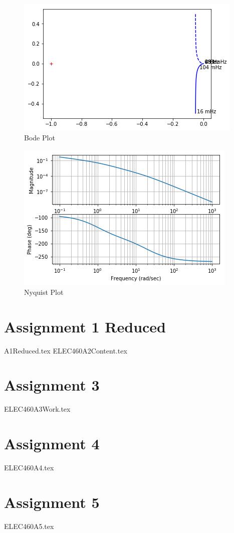 \documentclass{scrreprt}
\theoremstyle{plain}
\theoremstyle{definition}
\theoremstyle{remark}
\begin{document}
\begin{figure}
	\includegraphics[width=0.7\linewidth]{Assignments/A1/ipython_files/qt_img494204706881540}
	\caption{Bode Plot}
\end{figure}

\begin{figure}
	\includegraphics[width=0.7\linewidth]{Assignments/A1/ipython_files/qt_img492813137477636}
	\caption{Nyquist Plot}
\end{figure}

\section{Assignment 1 Reduced}
{A1Reduced.tex}
{ELEC460A2Content.tex}

\section{Assignment 3}
{ELEC460A3Work.tex}
\section{Assignment 4}
{ELEC460A4.tex}

\section{Assignment 5}
{ELEC460A5.tex}
\end{document}
